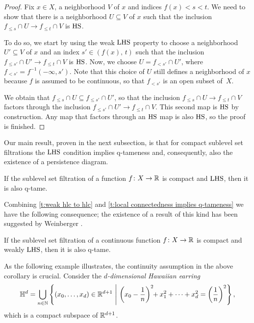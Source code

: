 \begin{proof}
	Fix $x \in X$, a neighborhood $V$ of $x$ and indices $f(x) < s < t$.
	We need to show that there is a neighborhood $U \subseteq V$ of $x$ such that the inclusion $f_{\leq s} \cap U \to f_{\leq t} \cap V$ is $\mathrm{HS}$.

	To do so, we start by using the weak $\mathrm{LHS}$ property to choose a neighborhood $U' \subseteq V$ of $x$ and an index $s' \in (f(x),\, t)$ such that the inclusion $f_{\leq s'} \cap U' \to f_{\leq t} \cap V$ is $\mathrm{HS}$.
	Now, we choose $U = f_{< s'} \cap U'$, where $f_{< s'} = f^{-1} (-\infty, s')$.
	Note that this choice of $U$ still defines a neighborhood of $x$ because $f$ is assumed to be continuous, so that $f_{< s'}$ is an open subset of~$X$.

	We obtain that $f_{\leq s} \cap U \subseteq f_{\leq s'} \cap U'$, so that the inclusion $f_{\leq s} \cap U \to f_{\leq t} \cap V$ factors through the inclusion $f_{\leq s'} \cap U' \to f_{\leq t} \cap V$.
	This second map is $\mathrm{HS}$ by construction.
	Any map that factors through an $\mathrm{HS}$ map is also $\mathrm{HS}$, so the proof is finished.
\end{proof}

Our main result, proven in the next subsection, is that for compact sublevel set filtrations the $\mathrm{LHS}$ condition implies \mbox{q-tameness} and, consequently, also the existence of a persistence diagram.

\begin{thm} \label{t:local connectedness implies q-tameness}
	If the sublevel set filtration of a function $f \colon X \to \mathbb{R}$ is compact and	$\mathrm{LHS}$, then it is also q-tame.
\end{thm}

Combining \cref{t:weak hlc to hlc} and \cref{t:local connectedness implies q-tameness} we have the following consequence;
the existence of a result of this kind has been suggested by Weinberger \cite{Weinberger.2011}.


\begin{cor} \label{c:q-tameness for continuous functions}
	If the sublevel set filtration of a continuous function $f \colon X \to \mathbb{R}$ is compact and weakly $\mathrm{LHS}$, then it is also q-tame.
\end{cor}

As the following example illustrates, the continuity assumption in the above corollary is crucial.
Consider the \emph{$d$-dimensional Hawaiian earring}
\begin{equation*}
\mathbb{H}^d = \bigcup_{n \in \mathbb{N}} \left\{ (x_0, \dots, x_d) \in \mathbb{R}^{d+1} \ \middle | \ \left( x_0 - \frac{1}{n} \right)^2 \!\! + x_1^2 + \dots + x_d^2 = \left( \frac{1}{n} \right)^2 \right\},
\end{equation*}
which is a compact subspace of $\mathbb{R}^{d+1}$.

